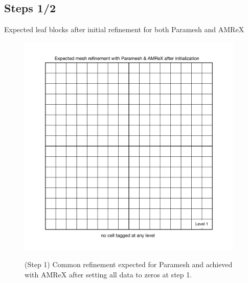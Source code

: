 \documentclass[12pt,letterpaper]{article}
\begin{document}
\subsection{Steps 1/2}
Expected leaf blocks after initial refinement for both Paramesh and AMReX
\begin{figure}[!hp]
\begin{center}
\includegraphics[width=4.25in]{TestRefine_Step1_Both.pdf}\\
\caption{(Step 1) Common refinement expected for Paramesh and achieved with AMReX after
setting all data to zeros at step 1.}
\end{center}
\end{figure}

\newpage
\end{document}
